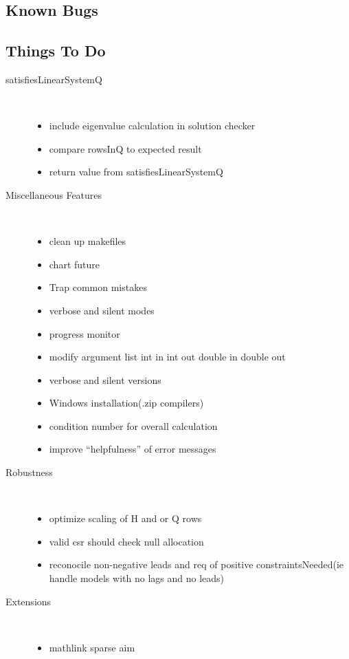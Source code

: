 \documentclass[12pt]{article}
\begin{document}
\subsection{Known Bugs}
\label{sec:knownbugs}


\subsection{Things To Do}
\label{sec:thingtodo}
\begin{description}
\item[satisfiesLinearSystemQ] \ 
  \begin{itemize}
\item include eigenvalue calculation in solution checker
\item compare rowsInQ to expected result
\item return value from satisfiesLinearSystemQ
  \end{itemize}
\item[Miscellaneous Features] \ 
  \begin{itemize}
\item clean up makefiles
\item chart future
\item Trap common mistakes
\item verbose and silent modes
\item progress monitor
\item modify argument list int in int out double in double out
\item verbose and silent versions
\item Windows installation(.zip compilers)
\item condition number for overall calculation
\item improve ``helpfulness'' of error messages
  \end{itemize}
\item[Robustness] \ 
  \begin{itemize}
  \item optimize scaling of H and or Q rows
\item valid csr should check null allocation
\item reconocile non-negative leads and req of positive constraintsNeeded(ie handle models with no lags and no leads)
  \end{itemize}
\item[Extensions] \ 
  \begin{itemize}
\item mathlink sparse aim

\end{itemize}
\end{description}
\end{document}
